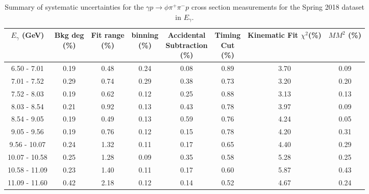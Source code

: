 \begin{table}[!htbp]
    \small
    \centering
    \caption{Summary of systematic uncertainties for the $\gamma p \rightarrow \phi \pi^{+} \pi^{-} p$ cross section measurements for the Spring 2018 dataset in $E_{\gamma}$.}
    \label{tab.syserr.phi2pi.3.1}
    \begin{tabular}{|c|c|c|c|c|c|c|c|}
        \hline
        $E_{\gamma}$ (GeV)&\thead{Bkg deg\\(\%)}&\thead{Fit range\\(\%)}&\thead{binning\\(\%)}&\thead{Accidental\\Subtraction\\(\%)}&\thead{Timing\\Cut\\(\%)}&\thead{Kinematic\\Fit $\chi^{2}$(\%)}&\thead{$MM^{2}$\\(\%)}\\
        \hline
        6.50 - 7.01 & 0.19 & 0.48 & 0.24 & 0.08 & 0.89 & 3.70 & 0.09 \\ 
        7.01 - 7.52 & 0.29 & 0.74 & 0.29 & 0.38 & 0.73 & 3.20 & 0.20 \\ 
        7.52 - 8.03 & 0.19 & 0.62 & 0.12 & 0.25 & 0.88 & 3.13 & 0.13 \\ 
        8.03 - 8.54 & 0.21 & 0.92 & 0.13 & 0.43 & 0.78 & 3.97 & 0.09 \\ 
        8.54 - 9.05 & 0.19 & 0.49 & 0.13 & 0.59 & 0.76 & 4.24 & 0.05 \\ 
        9.05 - 9.56 & 0.19 & 0.76 & 0.12 & 0.15 & 0.78 & 4.20 & 0.31 \\ 
        9.56 - 10.07 & 0.24 & 1.32 & 0.11 & 0.17 & 0.65 & 4.40 & 0.29 \\ 
        10.07 - 10.58 & 0.25 & 1.28 & 0.09 & 0.35 & 0.58 & 5.28 & 0.25 \\ 
        10.58 - 11.09 & 0.23 & 1.40 & 0.11 & 0.17 & 0.60 & 5.87 & 0.43 \\ 
        11.09 - 11.60 & 0.42 & 2.18 & 0.12 & 0.14 & 0.52 & 4.67 & 0.24 \\
        \hline
    \end{tabular}
\end{table}

